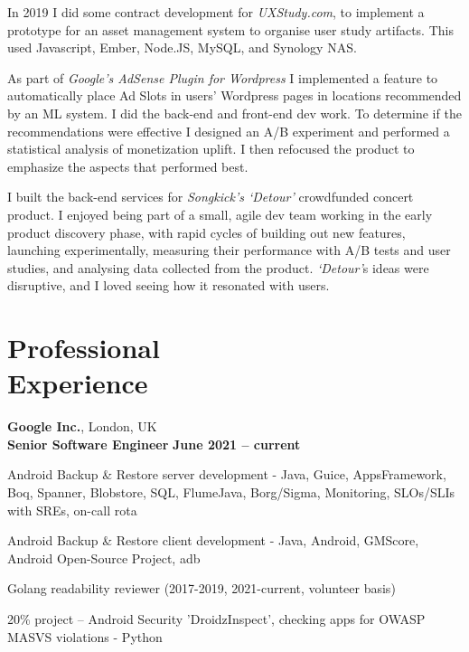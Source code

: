 \documentclass[line]{resume}
\begin{document}
\begin{resume}
    In 2019 I did some contract development for \textsl{UXStudy.com}, to implement a prototype for an asset management
    system to organise user study artifacts. This used Javascript, Ember, Node.JS, MySQL, and Synology NAS.

    As part of \textsl{Google's AdSense Plugin for Wordpress} I implemented a feature to automatically place Ad Slots
    in users' Wordpress pages in locations recommended by an ML system. I did the back-end and front-end dev work.  To
    determine if the recommendations were effective I designed an A/B experiment and performed a statistical analysis
    of monetization uplift.  I then refocused the product to emphasize the aspects that performed best.

    I built the back-end services for \textsl{Songkick's `Detour'} crowdfunded concert product. I enjoyed being part
    of a small, agile dev team working in the early product discovery phase, with rapid cycles of building out new
    features, launching experimentally, measuring their performance with A/B tests and user studies, and analysing
    data collected from the product. \textsl{`Detour'}s ideas were disruptive, and I loved seeing how it resonated
    with users.

    \pagebreak

    \section{\mysidestyle Professional\\Experience}

    \textbf{Google Inc.}, London, UK \vspace{2mm}\\\vspace{1mm}%
    \textbf{Senior Software Engineer} \hfill \textbf{June 2021 -- current}\vspace{-3mm}\\\vspace{-1mm}%
    \begin{list2}
        \item Android Backup \& Restore server development - Java, Guice, AppsFramework, Boq, Spanner, Blobstore, SQL,
        FlumeJava, Borg/Sigma, Monitoring, SLOs/SLIs with SREs, on-call rota
        \item Android Backup \& Restore client development - Java, Android, GMScore, Android Open-Source Project, adb
        \item Golang readability reviewer (2017-2019, 2021-current, volunteer basis)
        \item 20\% project -- Android Security 'DroidzInspect', checking apps for OWASP MASVS violations - Python
    \end{list2}\vspace{-1.5mm}


\end{resume}
\end{document}
